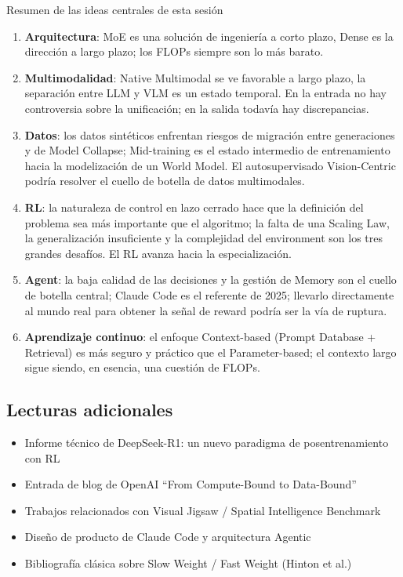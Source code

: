 \documentclass[a4paper]{article}
\begin{document}
\begin{importantbox}{Resumen de las ideas centrales de esta sesión}
\begin{enumerate}
  \item \textbf{Arquitectura}: MoE es una solución de ingeniería a corto plazo, Dense es la dirección a largo plazo; los FLOPs siempre son lo más barato.
  \item \textbf{Multimodalidad}: Native Multimodal se ve favorable a largo plazo, la separación entre LLM y VLM es un estado temporal. En la entrada no hay controversia sobre la unificación; en la salida todavía hay discrepancias.
  \item \textbf{Datos}: los datos sintéticos enfrentan riesgos de migración entre generaciones y de Model Collapse; Mid-training es el estado intermedio de entrenamiento hacia la modelización de un World Model. El autosupervisado Vision-Centric podría resolver el cuello de botella de datos multimodales.
  \item \textbf{RL}: la naturaleza de control en lazo cerrado hace que la definición del problema sea más importante que el algoritmo; la falta de una Scaling Law, la generalización insuficiente y la complejidad del environment son los tres grandes desafíos. El RL avanza hacia la especialización.
  \item \textbf{Agent}: la baja calidad de las decisiones y la gestión de Memory son el cuello de botella central; Claude Code es el referente de 2025; llevarlo directamente al mundo real para obtener la señal de reward podría ser la vía de ruptura.
  \item \textbf{Aprendizaje continuo}: el enfoque Context-based (Prompt Database + Retrieval) es más seguro y práctico que el Parameter-based; el contexto largo sigue siendo, en esencia, una cuestión de FLOPs.
\end{enumerate}
\end{importantbox}

\subsection{Lecturas adicionales}
\begin{itemize}
  \item Informe técnico de DeepSeek-R1: un nuevo paradigma de posentrenamiento con RL
  \item Entrada de blog de OpenAI ``From Compute-Bound to Data-Bound''
  \item Trabajos relacionados con Visual Jigsaw / Spatial Intelligence Benchmark
  \item Diseño de producto de Claude Code y arquitectura Agentic
  \item Bibliografía clásica sobre Slow Weight / Fast Weight (Hinton et al.)
\end{itemize}
\end{document}
